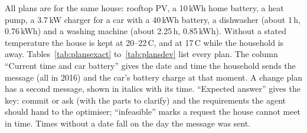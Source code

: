 \documentclass[12pt,a4paper]{report}
\begin{document}
All plans are for the same house: rooftop PV, a 10\,kWh home battery,
a heat pump, a 3.7\,kW charger for a car with a 40\,kWh battery, a
dishwasher (about 1\,h, 0.76\,kWh) and a washing machine (about
2.25\,h, 0.85\,kWh). Without a stated temperature the house is kept at
20--22\,\textdegree{}C, and at 17\,\textdegree{}C while the household is away.
Tables~\ref{tab:plansexact} to~\ref{tab:plansdev} list every plan. The
column ``Current time and car battery'' gives the date and time the
household sends the message (all in 2016) and the car's battery charge
at that moment. A change plan has a second
message, shown in italics with its time. ``Expected answer'' gives the
key: commit or ask (with the parts to clarify) and the requirements the
agent should hand to the optimiser; ``infeasible'' marks a request the
house cannot meet in time. Times without a date fall on the day the
message was sent.
\end{document}
